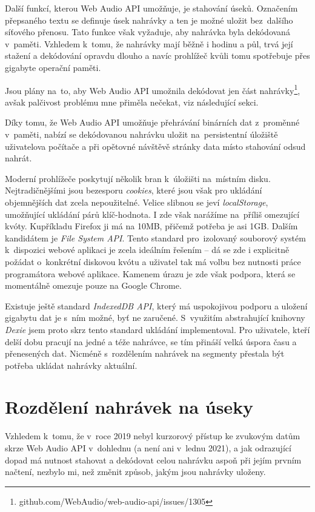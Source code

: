 Další funkcí, kterou Web Audio API umožňuje, je stahování úseků. Označením
přepsaného textu se definuje úsek nahrávky a ten je možné uložit bez~dalšího
síťového přenosu. Tato funkce však vyžaduje, aby nahrávka byla dekódovaná
v~paměti. Vzhledem k~tomu, že nahrávky mají běžně i hodinu a půl, trvá její
stažení a dekódování opravdu dlouho a navíc prohlížeč kvůli tomu spotřebuje přes
gigabyte operační paměti.

Jsou plány na~to, aby Web Audio API umožnila dekódovat jen část
nahrávky\footnote{github.com/WebAudio/web-audio-api/issues/1305}, avšak
palčivost problému mne přiměla nečekat, viz následující sekci.

Díky tomu, že Web Audio API umožňuje přehrávání binárních dat z~proměnné
v~paměti, nabízí se dekódovanou nahrávku uložit na~persistentní úložiště
uživatelova počítače a při opětovné návštěvě stránky data místo stahování odsud
nahrát.

Moderní prohlížeče poskytují několik bran k~úložišti na~místním disku.
Nejtradičnějšími jsou bezesporu \textit{cookies}, které jsou však pro ukládání
objemnějších dat zcela nepoužitelné. Velice slibnou se jeví
\textit{localStorage}, umožňující ukládání párů klíč-hodnota. I zde však
narážíme na~příliš omezující kvóty. Kupříkladu Firefox ji má na 10MB, přičemž
potřeba je asi 1GB. Dalším kandidátem je \textit{File System API}. Tento
standard pro~izolovaný souborový systém k~dispozici webové aplikaci je zcela
ideálním řešením -- dá se zde i explicitně požádat o~konkrétní diskovou kvótu a
uživatel tak má volbu bez nutnosti práce programátora webové aplikace. Kamenem
úrazu je zde však podpora, která se momentálně omezuje pouze na Google Chrome.

Existuje ještě standard \textit{IndexedDB API}, který má uspokojivou
podporu a uložení gigabytu dat je s~ním možné, byť ne zaručené. S~využitím
abstrahující knihovny \textit{Dexie} jsem proto skrz tento standard ukládání
implementoval. Pro uživatele, kteří delší dobu pracují na jedné a téže nahrávce,
se tím přináší velká úspora času a přenesených dat. Nicméně s~rozdělením
nahrávek na segmenty přestala být potřeba ukládat nahrávky aktuální.

\section{Rozdělení nahrávek na úseky}
\label{sec:segmenty}

Vzhledem k~tomu, že v~roce 2019 nebyl kurzorový přístup ke zvukovým datům
skrze Web Audio API v~dohlednu (a není ani v~lednu 2021), a jak odrazující dopad má nutnost
stahovat a dekódovat celou nahrávku aspoň při jejím prvním načtení, nezbylo mi,
než změnit způsob, jakým jsou nahrávky uloženy. %

